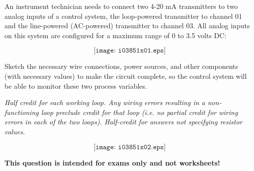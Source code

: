 

An instrument technician needs to connect two 4-20 mA transmitters to two analog inputs of a control system, the loop-powered transmitter to channel 01 and the line-powered (AC-powered) transmitter to channel 03.  All analog inputs on this system are configured for a maximum range of 0 to 3.5 volts DC:

$$\texttt{[image: i03851x01.eps]}$$

Sketch the necessary wire connections, power sources, and other components (with necessary values) to make the circuit complete, so the control system will be able to monitor these two process variables.







{\it Half credit for each working loop.  Any wiring errors resulting in a non-functioning loop preclude credit for that loop (i.e. no partial credit for wiring errors in each of the two loops).  Half-credit for answers not specifying resistor values.}

$$\texttt{[image: i03851x02.eps]}$$








{\bf This question is intended for exams only and not worksheets!}



